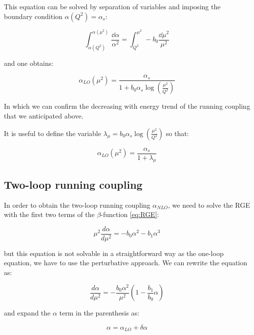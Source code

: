 \documentclass[../main.tex]{subfiles}
\begin{document}
This equation can be solved by separation of variables and imposing 
the boundary condition $\alpha(Q^2) = \alpha_s$:

\begin{equation}
   \int_{\alpha(Q^2)}^{\alpha(\mu^2)} \frac{\dd\alpha}{\alpha^2} = \int _{Q^2}^{\mu^2}-b_0 \frac{\dd\mu^2}{\mu^2} 
\end{equation}

and one obtains:

\begin{equation}
    \alpha_{LO}(\mu^2) = \frac{\alpha_s}{1+b_0 \alpha_s \log(\frac{\mu^2}{Q^2})}
\end{equation}

In which we can confirm the decreasing with energy trend of the running coupling that we
anticipated above. 

It is useful to define the variable $\lambda_\mu = b_0 \alpha_s \log(\frac{\mu^2}{Q^2})$ so that:

\begin{equation}
    \alpha_{LO}(\mu^2) = \frac{\alpha_s}{1+\lambda_\mu}
\end{equation}


\subsection{Two-loop running coupling}

In order to obtain the two-loop running coupling $\alpha_{NLO}$, 
we need to solve the RGE with the first two terms of the $\beta$-function \cref{eq:RGE}:

\begin{equation}
    \mu^2 \frac{d\alpha}{d\mu^2} = - b_0 \alpha^2 - b_1 \alpha^3
\end{equation}

but this equation is not solvable in a straightforward way as the one-loop equation, 
we have to use the perturbative approach. We can rewrite the equation as:

\begin{equation}
    \frac{d\alpha}{d\mu^2} = - \frac{b_0 \alpha^2}{\mu^2} ( 1 - \frac{b_1}{b_0} \alpha )
\end{equation}

and expand the $\alpha$ term in the parenthesis as:

\begin{equation}
    \alpha = \alpha_{LO} + \delta \alpha
\end{equation}
\end{document}
